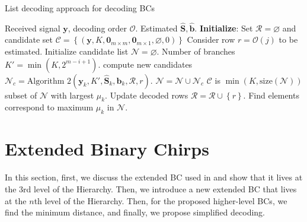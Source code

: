 \documentclass[lettersize,journal,onecolumn]{IEEEtran}
\begin{document}
  \begin{algorithm}
 	\caption{List decoding approach for decoding BCs}\label{alg:FinBCDecoder}
 	\begin{algorithmic}[1]
 		\Require Received signal $\mathbf{y}$, decoding order $\mathcal{O}$.
 		\Ensure Estimated $\widehat{\mathbf{S}}, \widehat{\mathbf{b}}$. 
 		\State \textbf{Initialize}: Set $\mathcal{R}=\varnothing$ and candidate set $\mathcal{C} = \left\{ \left( \mathbf{y}, K, \mathbf{0}_{m\times m}, \mathbf{0}_{m \times 1} , \varnothing ,0\right) \right\}$
 		\State Consider row $r = \mathcal{O}(j)$ to be estimated.
 		\State Initialize candidate list $\mathcal{N} = \varnothing$.
 		\State Number of branches $K' = \min \left(K, 2^{m-i+1}\right)$.
 		\State compute new candidates $\mathcal{N}_c = \text{Algorithm 2}\left(\mathbf{y}_k, K',\widehat{\mathbf{S}}_k, \widehat{\mathbf{b}}_k, \mathcal{R}, r \right)$.
 		\State $\mathcal{N} = \mathcal{N} \cup \mathcal{N}_c$
 		\EndFor 
 		\State $\mathcal{C}$ is $\min \left(K, \text{size}\left(\mathcal{N}\right) \right)$ subset of $\mathcal{N}$ with largest $\mu_k$.
 		\State Update decoded rows $\mathcal{R}=\mathcal{R}\cup \left\{ r\right\}$.
 		\Else
 		\State Find elements correspond to maximum $\mu_k$ in $\mathcal{N}$.
 		\EndIf
 		\EndFor{}
 	\end{algorithmic}
 \end{algorithm}
 
\section{Extended Binary Chirps}
In this section, first, we discuss the extended BC used in \cite{PitvalExtendedChirp21} and show that it lives at the 3rd level of the Hierarchy. Then, we introduce a new extended BC that lives at the $n$th level of the Hierarchy. Then, for the proposed higher-level BCs, we find the minimum distance, and finally, we propose simplified decoding.
\end{document}
